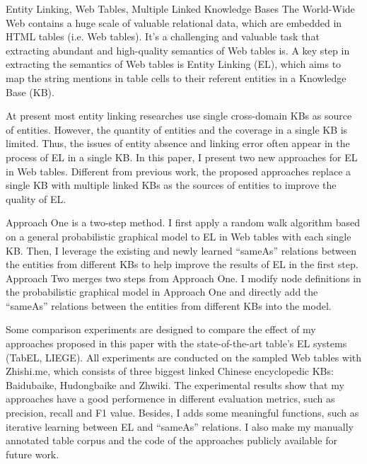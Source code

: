 \documentclass[bachelor, printoneside]{seuthesis} %
\begin{document}
\begin{englishabstract}{Entity Linking, Web Tables, Multiple Linked Knowledge Bases}
The World-Wide Web contains a huge scale of valuable relational data, which are embedded in HTML tables (i.e. Web tables).
It's a challenging and valuable task that extracting abundant and high-quality semantics of Web tables is.
A key step in extracting the semantics of Web tables is Entity Linking (EL), which aims to map the string mentions in table cells to their referent entities in a Knowledge Base (KB).\par

At present most entity linking researches use single cross-domain KBs as source of entities.
However, the quantity of entities and the coverage in a single KB is limited.
Thus, the issues of entity absence and linking error often appear in the process of EL in a single KB.
In this paper, I present two new approaches for EL in Web tables.
Different from previous work, the proposed approaches replace a single KB with multiple linked KBs as the sources of entities to improve the quality of EL.

Approach One is a two-step method.
I first apply a random walk algorithm based on a general probabilistic graphical model to EL in Web tables with each single KB.
Then, I leverage the existing and newly learned ``sameAs'' relations between the entities from different KBs to help improve the results of EL in the first step.
Approach Two merges two steps from Approach One.
I modify node definitions in the probabilistic graphical model in Approach One and directly add the ``sameAs'' relations between the entities from different KBs into the model.\par

Some comparison experiments are designed to compare the effect of my approaches proposed in this paper with the state-of-the-art table’s EL systems (TabEL, LIEGE).
All experiments are conducted on the sampled Web tables with Zhishi.me, which consists of three biggest linked Chinese encyclopedic KBs: Baidubaike, Hudongbaike and Zhwiki.
The experimental results show that my approaches have a good performence in different evaluation metrics, such as precision, recall and F1 value.
Besides, I adds some meaningful functions, such as iterative learning between EL and ``sameAs'' relations.
I also make my manually annotated table corpus and the code of the approaches publicly available for future work.
\end{englishabstract}
\end{document}
